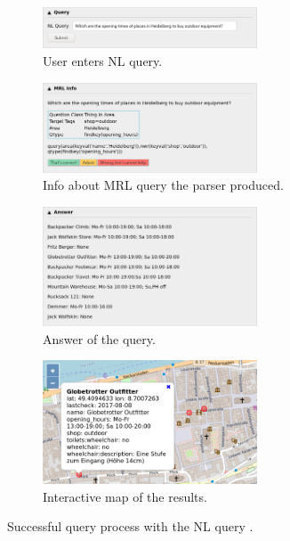 \begin{figure}[h]
  \centering
  \begin{subfigure}{\textwidth}
    \centering
    \includegraphics[width=0.7\textwidth]{fig/screenshot_outdoor_nl.png}
    \caption{User enters NL query.}
  \end{subfigure}
  \begin{subfigure}{\textwidth}
    \centering
    \includegraphics[width=0.7\textwidth]{fig/screenshot_outdoor_mrl.png}
    \caption{Info about MRL query the parser produced.}
  \end{subfigure}
  \begin{subfigure}{\textwidth}
    \centering
    \includegraphics[width=0.7\textwidth]{fig/screenshot_outdoor_answer.png}
    \caption{Answer of the query.}
  \end{subfigure}
  \begin{subfigure}{\textwidth}
    \centering
    \includegraphics[width=0.7\textwidth]{fig/screenshot_outdoor_map.png}
    \caption{Interactive map of the results.}
  \end{subfigure}
  \caption[Successful query process]{Successful query process with the NL query
    .}
  \label{fig:successful-query-process}
\end{figure}

